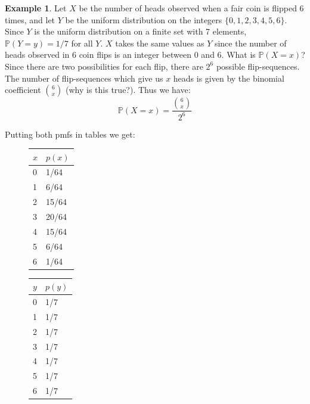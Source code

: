\documentclass[12pt]{article}
\theoremstyle{definition}
\newtheorem*{example}{Example}
\theoremstyle{remark}
\def\P{{\mathbb P}}
\begin{document}
\begin{example}Let $X$ be the number of heads observed when a fair coin is flipped 6 times, and let $Y$ be the uniform distribution on the integers $\{0, 1, 2, 3, 4, 5, 6\}$. Since $Y$ is the uniform distribution on a finite set with 7 elements, $\P(Y = y) = 1/7$ for all $Y$. $X$ takes the same values as $Y$ since the number of heads observed in 6 coin flips is an integer between 0 and 6. What is $\P(X = x)$? Since there are two possibilities for each flip, there are $2^6$ possible flip-sequences. The number of flip-sequences which give us $x$ heads is given by the binomial coefficient $\binom{6}{x}$ (why is this true?). Thus we have:
\[
\P(X = x) = \frac{\binom{6}{x}}{2^6}
\]
\end{example}
Putting both pmfs in tables we get:

\begin{figure}[H]
\centering
\begin{tabular}{l@{\hskip 2cm}l}
\toprule
$x$ & $p(x)$\\
\midrule
0 & 1/64\\
1 & 6/64\\
2 & 15/64\\
3 & 20/64\\
4 & 15/64\\
5 & 6/64\\
6 & 1/64\\
\bottomrule
\end{tabular}
\end{figure}

\begin{figure}[H]
\centering
\begin{tabular}{l@{\hskip 2cm}l}
\toprule
$y$ & $p(y)$\\
\midrule
0 & 1/7\\
1 & 1/7\\
2 & 1/7\\
3 & 1/7\\
4 & 1/7\\
5 & 1/7\\
6 & 1/7\\
\bottomrule
\end{tabular}
\end{figure}
\end{document}
